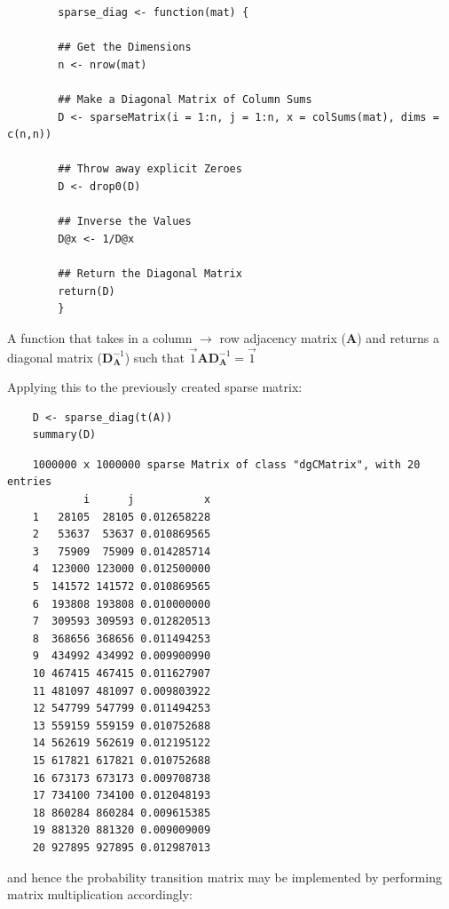 \documentclass[11pt, twoside]{report}
\begin{document}
\begin{listing}[htbp]
    \begin{tcolorbox}
        \begin{verbatim}
        sparse_diag <- function(mat) {

        ## Get the Dimensions
        n <- nrow(mat)

        ## Make a Diagonal Matrix of Column Sums
        D <- sparseMatrix(i = 1:n, j = 1:n, x = colSums(mat), dims = c(n,n))

        ## Throw away explicit Zeroes
        D <- drop0(D)

        ## Inverse the Values
        D@x <- 1/D@x

        ## Return the Diagonal Matrix
        return(D)
        }
        \end{verbatim}
    \end{tcolorbox}
\caption{\label{sparse-diag} A function that takes in a column \(\rightarrow\) row adjacency matrix (\(\mathbf{A}\)) and returns a diagonal matrix (\(\mathbf{D}^{-1}_{\mathbf{A}}\)) such that \(\vec{1}\mathbf{A} \mathbf{D}^{-1}_{\mathbf{A}} = \vec{1}\)}
\end{listing}

Applying this to the previously created sparse matrix:

\begin{tcolorbox}
    \begin{verbatim}
    D <- sparse_diag(t(A))
    summary(D)
    \end{verbatim}
\tcblower
    \begin{verbatim}
    1000000 x 1000000 sparse Matrix of class "dgCMatrix", with 20 entries
            i      j           x
    1   28105  28105 0.012658228
    2   53637  53637 0.010869565
    3   75909  75909 0.014285714
    4  123000 123000 0.012500000
    5  141572 141572 0.010869565
    6  193808 193808 0.010000000
    7  309593 309593 0.012820513
    8  368656 368656 0.011494253
    9  434992 434992 0.009900990
    10 467415 467415 0.011627907
    11 481097 481097 0.009803922
    12 547799 547799 0.011494253
    13 559159 559159 0.010752688
    14 562619 562619 0.012195122
    15 617821 617821 0.010752688
    16 673173 673173 0.009708738
    17 734100 734100 0.012048193
    18 860284 860284 0.009615385
    19 881320 881320 0.009009009
    20 927895 927895 0.012987013
    \end{verbatim}
\end{tcolorbox}

and hence the probability transition matrix may be implemented by performing matrix multiplication accordingly:
\end{document}
